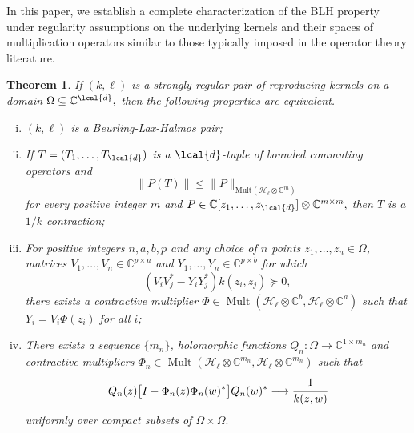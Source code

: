 \documentclass[a4paper,reqno,index]{amsart}
\numberwithin{equation}{section}
\newtheorem{theorem}{Theorem}[section]
\newcommand{\CC}{\mathbb{C}}
\newcommand{\Mult}{\operatorname{Mult}}
\newcommand{\opphi}[4]{{#1}\in \Mult({#3},{#4})}
\theoremstyle{definition}
\begin{document}
  In this paper, we establish  a complete characterization of the BLH property under  regularity assumptions on the underlying kernels and their spaces
 of multiplication operators similar to those typically imposed
 in the operator theory literature.
  

     
 \begin{theorem}\label{intromain} 
If $(k, \ell)$ is a strongly regular pair of reproducing kernels on a domain $\Omega\subseteq \CC^{\lcal{d}},$ 
 then the following properties are equivalent.
\begin{enumerate}[(i)]\itemsep=6pt
    \item \label{i:im:blh}
       $(k, \ell)$ is a Beurling-Lax-Halmos pair;
\item \label{i:im:vN}
 If  $T=(T_1, \dots, T_{\lcal{d}})$ is a $\lcal{d}$-tuple of bounded commuting operators and 
\begin{equation*} 
  \|P(T)\|\le \|P\|_{\text{Mult}(\mathcal{H}_{\ell}\otimes \mathbb{C}^m)}  
\end{equation*}
for every positive integer $m$ and  $P\in \CC[z_1, \dots , z_{\lcal{d}}]\otimes \mathbb{C}^{m\times m},$
then $T$ is a $1/k$ contraction;
\item \label{i:im:leach} 
 For positive integers $n,a,b,p$ and 
   any choice of $n$ points 
 $z_1, \dots, z_n\in \Omega$,  matrices $V_1, \dots, V_n\in \mathbb{C}^{p\times a}$ and  $Y_1, \dots, Y_n\in \mathbb{C}^{p\times b}$ for which 
  \begin{equation*}         
    (V_iV_j^*-Y_iY_j^*)k(z_i, z_j)\succeq 0, 
\end{equation*}
 there exists a contractive multiplier $\opphi{\Phi}{\Omega}{\mathcal{H}_{\ell}\otimes \mathbb{C}^b} {\mathcal{H}_{\ell}\otimes \mathbb{C}^a}$
 such that $Y_i=V_i\Phi(z_i)$ for all $i$;
    \item \label{i:im:ad} 
        There exists a sequence $\{m_n\}$, 
holomorphic functions  $Q_n:\Omega\to \CC^{1\times m_n}$  and contractive multipliers $\opphi{\Phi_n}{\Omega}{\mathcal{H}_{\ell}\otimes\CC^{m_n}}{ \mathcal{H}_{\ell}\otimes\CC^{m_n}}$ such that       
    \begin{equation}    \label{1/k=intro}  
         Q_n(z)\big[I-\Phi_n(z)\Phi_n(w)^*\big]Q_n(w)^* \longrightarrow \cfrac{1}{k(z, w)}
    \end{equation}
uniformly over compact subsets of $\Omega\times\Omega.$
\end{enumerate}
 \end{theorem}
\end{document}
